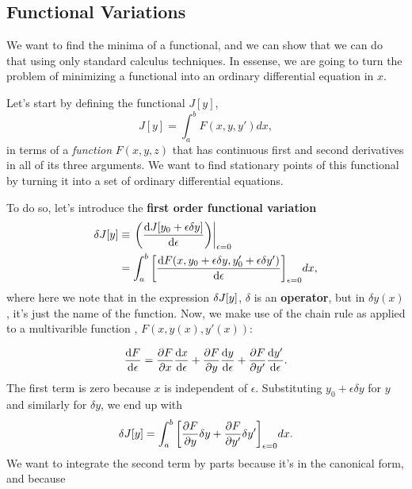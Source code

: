 \subsection{Functional Variations}
We want to find the minima of a functional, and we can show that we can do that using only standard calculus techniques. In essense, we are going to turn the problem of minimizing a functional into an ordinary differential equation in $x$.

Let's start by defining the functional $J[y]$,
\begin{equation}
  \label{eq:generic_functional}
  J[y] = \int_a^b F(x, y, y') dx,
\end{equation}
in terms of a \emph{function} $F(x, y, z)$ that has continuous first and second derivatives in all of its three arguments. We want to find stationary points  of this functional by turning it into a set of ordinary differential equations.

To do so, let's introduce the \textbf{first order functional variation}
\begin{equation}
  \label{eq:first_order_functional_variation}
  \begin{split}
    \var{J[y]} & \equiv \eval{\qty(\dv{J[y_0+\epsilon \delta y]}{\epsilon})}_{\epsilon=0}\\
    & = \int_a^b \qty[\dv{F(x, y_0 + \epsilon \delta y, y_0' + \epsilon \delta y')}{\epsilon}]_{\epsilon = 0} dx,    
  \end{split}
\end{equation}
where here we note that in the expression $\var{J[y]}$, $\delta$ is an \textbf{operator}, but in $\delta y(x)$, it's just the name of the function. Now, we make use of the chain rule as applied to a multivarible function , $F(x, y(x), y'(x))$:

\begin{equation}
  \label{eq:chain_rule}
  \dv{F}{\epsilon} = \pdv{F}{x} \dv{x}{\epsilon} + \pdv{F}{y} \dv{y}{\epsilon} + \pdv{F}{y'} \dv{y'}{\epsilon}.
\end{equation}
The first term is zero because $x$ is independent of $\epsilon$. Substituting $y_0 + \epsilon \delta y$ for $y$ and similarly for $\delta y$, we end up with
\begin{equation}
  \label{eq:first_order_functional_step2}
    \var{J[y]} = \int_a^b \qty[\pdv{F}{y} \delta y + \pdv{F}{y'} \delta y']_{\epsilon = 0} dx.
\end{equation}
We want to integrate the second term by parts because it's in the canonical form, and because 

